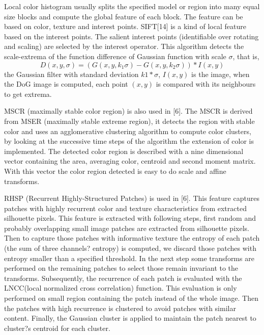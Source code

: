 \documentclass[conference,compsoc]{IEEEtran}
\begin{document}
Local color histogram usually splits the specified model or region into many equal size blocks and compute the global feature of each block. The feature can be based on color, texture and interest points. SIFT[14] is a kind of local feature based on the interest points. The salient interest points (identifiable over rotating and scaling) are selected by the interest operator. This algorithm detects the scale-extrema of the function difference of Gaussian function with scale $\sigma$, that is, 
$$D(x,y,\sigma) = (G(x,y,k_1\sigma)-G(x,y,k_2\sigma))*I(x,y)$$
the Gaussian filter with standard deviation $k1*\sigma$, $I(x, y)$ is the image, when the DoG image is computed, each point $(x, y)$ is compared with its neighbours to get  extrema.

MSCR (maximally stable color region) is also used in [6]. The MSCR is derived from MSER (maximally stable extreme region), it detects the region with stable color and uses an agglomerative clustering algorithm to compute color clusters, by looking at the successive time steps of the algorithm the extension of color is implemented. The detected color region is described with a nine dimensional vector containing the area, averaging color, centroid and second moment matrix. With this vector the color region detected is easy to do scale and affine transforms.

RHSP (Recurrent Highly-Structured Patches) is used in [6]. This feature captures patches with highly recurrent color and texture characteristics from extracted silhouette pixels. This feature is extracted with following steps, first random and probably overlapping small image patches are extracted from silhouette pixels. Then to capture those patches with informative texture the entropy of each patch (the sum of three channels? entropy) is computed, we discard those patches with entropy smaller than a specified threshold. In the next step some transforms are performed on the remaining patches to select those remain invariant to the transforms. Subsequently, the recurrence of each patch is evaluated with the LNCC(local normalized cross correlation) function. This evaluation is only performed on small region containing the patch instead of the whole image. Then the patches with high recurrence is clustered to avoid patches with similar content. Finally, the Gaussian cluster is applied to maintain the patch nearest to cluster?s centroid for each cluster.
 
\end{document}

